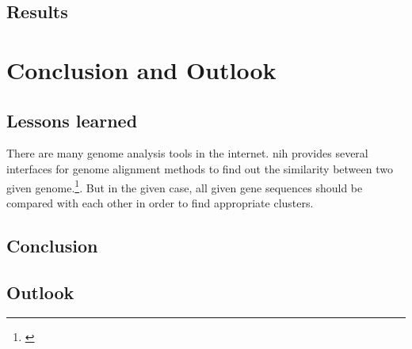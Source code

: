 \section{Results}\label{results}


\chapter{Conclusion and Outlook}\label{conclusion_outlook}
\section{Lessons learned}\label{lessons_learned}

There are many genome analysis tools in the internet. \gls{nih} provides several interfaces for genome alignment methods to find out the similarity between two given genome.\footnote{\autocite{blast}}.
But in the given case, all given gene sequences should be compared with each other in order to find appropriate clusters.


\section{Conclusion}\label{conclusion}
\section{Outlook}\label{outlook}	



\newpage






